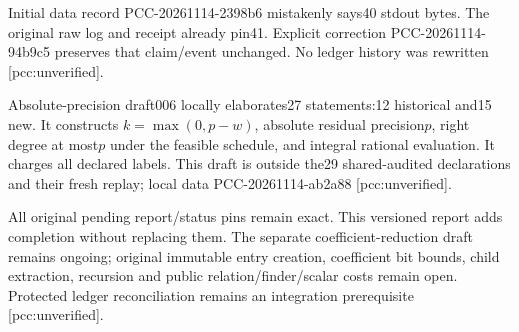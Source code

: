 \documentclass[10pt]{article}
\begin{document}
Initial data record PCC-20261114-2398b6 mistakenly says40 stdout bytes.
The original raw log and receipt already pin41. Explicit correction
PCC-20261114-94b9c5 preserves that claim/event unchanged. No ledger history
was rewritten [pcc:unverified].

Absolute-precision draft006 locally elaborates27 statements:12 historical
and15 new. It constructs $k=\max(0,p-w)$, absolute residual precision$p$,
right degree at most$p$ under the feasible schedule, and integral rational
evaluation. It charges all declared labels. This draft is outside the29
shared-audited declarations and their fresh replay; local data
PCC-20261114-ab2a88 [pcc:unverified].

All original pending report/status pins remain exact. This versioned report
adds completion without replacing them. The separate coefficient-reduction
draft remains ongoing; original immutable entry creation, coefficient bit
bounds, child extraction, recursion and public relation/finder/scalar costs
remain open. Protected ledger reconciliation remains an integration
prerequisite [pcc:unverified].
\end{document}
